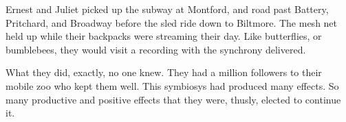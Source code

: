 

Ernest and Juliet picked up the subway at Montford, and road past
Battery, Pritchard, and Broadway before the sled ride down to
Biltmore.  The mesh net held up while their backpacks were streaming
their day.  Like butterflies, or bumblebees, they would visit a
recording with the synchrony delivered.  

What they did, exactly, no one knew.  They had a million followers to
their mobile zoo who kept them well.  This symbiosys had produced many
effects.  So many productive and positive effects that they were,
thusly, elected to continue it.

\bye
